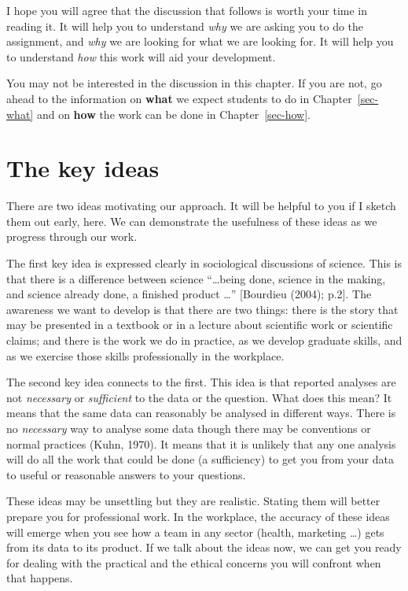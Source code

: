 \documentclass[
  letterpaper,
  DIV=11,
  numbers=noendperiod]{scrreprt}
\begin{document}
I hope you will agree that the discussion that follows is worth your
time in reading it. It will help you to understand \emph{why} we are
asking you to do the assignment, and \emph{why} we are looking for what
we are looking for. It will help you to understand \emph{how} this work
will aid your development.

You may not be interested in the discussion in this chapter. If you are
not, go ahead to the information on \textbf{what} we expect students to
do in Chapter~\ref{sec-what} and on \textbf{how} the work can be done in
Chapter~\ref{sec-how}.

\hypertarget{sec-why-key-ideas}{%
\section{The key ideas}\label{sec-why-key-ideas}}

There are two ideas motivating our approach. It will be helpful to you
if I sketch them out early, here. We can demonstrate the usefulness of
these ideas as we progress through our work.

The first key idea is expressed clearly in sociological discussions of
science. This is that there is a difference between science
``\ldots being done, science in the making, and science already done, a
finished product \ldots{}'' {[}Bourdieu (2004); p.2{]}. The awareness we
want to develop is that there are two things: there is the story that
may be presented in a textbook or in a lecture about scientific work or
scientific claims; and there is the work we do in practice, as we
develop graduate skills, and as we exercise those skills professionally
in the workplace.

The second key idea connects to the first. This idea is that reported
analyses are not \emph{necessary} or \emph{sufficient} to the data or
the question. What does this mean? It means that the same data can
reasonably be analysed in different ways. There is no \emph{necessary}
way to analyse some data though there may be conventions or normal
practices (Kuhn, 1970). It means that it is unlikely that any one
analysis will do all the work that could be done (a sufficiency) to get
you from your data to useful or reasonable answers to your questions.

These ideas may be unsettling but they are realistic. Stating them will
better prepare you for professional work. In the workplace, the accuracy
of these ideas will emerge when you see how a team in any sector
(health, marketing \ldots) gets from its data to its product. If we talk
about the ideas now, we can get you ready for dealing with the practical
and the ethical concerns you will confront when that happens.
\end{document}
